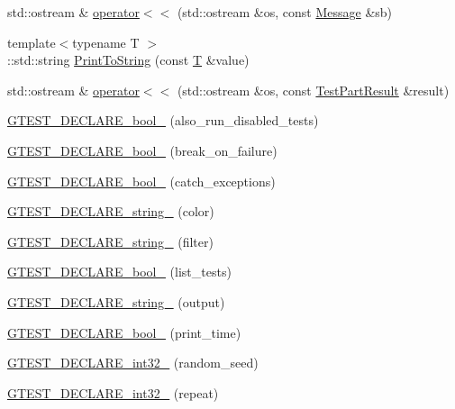 \begin{DoxyCompactItemize}
std\+::ostream \& \hyperlink{namespacetesting_a7b802e532fd68749765cb7dc156130db}{operator$<$$<$} (std\+::ostream \&os, const \hyperlink{classtesting_1_1_message}{Message} \&sb)
\item 
{\footnotesize template$<$typename T $>$ }\\\+::std\+::string \hyperlink{namespacetesting_aa5717bb1144edd1d262d310ba70c82ed}{Print\+To\+String} (const \hyperlink{functions__7_8js_adf1f3edb9115acb0a1e04209b7a9937b}{T} \&value)
\item 
std\+::ostream \& \hyperlink{namespacetesting_a7c88897836b9f492190fb2b9dfa3a327}{operator$<$$<$} (std\+::ostream \&os, const \hyperlink{classtesting_1_1_test_part_result}{Test\+Part\+Result} \&result)
\item 
\hyperlink{namespacetesting_a4c08ba9fcb0581c61e25968e520efa48}{G\+T\+E\+S\+T\+\_\+\+D\+E\+C\+L\+A\+R\+E\+\_\+bool\+\_\+} (also\+\_\+run\+\_\+disabled\+\_\+tests)
\item 
\hyperlink{namespacetesting_a5868c3980b2f69f511fc8c3de7cdfc17}{G\+T\+E\+S\+T\+\_\+\+D\+E\+C\+L\+A\+R\+E\+\_\+bool\+\_\+} (break\+\_\+on\+\_\+failure)
\item 
\hyperlink{namespacetesting_ab6f1777f7b740f31e41f7da017447b58}{G\+T\+E\+S\+T\+\_\+\+D\+E\+C\+L\+A\+R\+E\+\_\+bool\+\_\+} (catch\+\_\+exceptions)
\item 
\hyperlink{namespacetesting_a0f658c915a1e60996a2ab00a06612723}{G\+T\+E\+S\+T\+\_\+\+D\+E\+C\+L\+A\+R\+E\+\_\+string\+\_\+} (color)
\item 
\hyperlink{namespacetesting_a20d69860ce843142c7f740262e6b0c9a}{G\+T\+E\+S\+T\+\_\+\+D\+E\+C\+L\+A\+R\+E\+\_\+string\+\_\+} (filter)
\item 
\hyperlink{namespacetesting_af2cd3595c571ca408afc337bc4bb2619}{G\+T\+E\+S\+T\+\_\+\+D\+E\+C\+L\+A\+R\+E\+\_\+bool\+\_\+} (list\+\_\+tests)
\item 
\hyperlink{namespacetesting_a3fe54dd551f1c36cfdd1b36cd6881a44}{G\+T\+E\+S\+T\+\_\+\+D\+E\+C\+L\+A\+R\+E\+\_\+string\+\_\+} (output)
\item 
\hyperlink{namespacetesting_aeccefd463a0942da24750e1bbee76041}{G\+T\+E\+S\+T\+\_\+\+D\+E\+C\+L\+A\+R\+E\+\_\+bool\+\_\+} (print\+\_\+time)
\item 
\hyperlink{namespacetesting_ae754999b59509808254d39e3a3cf38e0}{G\+T\+E\+S\+T\+\_\+\+D\+E\+C\+L\+A\+R\+E\+\_\+int32\+\_\+} (random\+\_\+seed)
\item 
\hyperlink{namespacetesting_a315ef0647e4f2795bf1705de8e9c9659}{G\+T\+E\+S\+T\+\_\+\+D\+E\+C\+L\+A\+R\+E\+\_\+int32\+\_\+} (repeat)

\end{DoxyCompactItemize}

